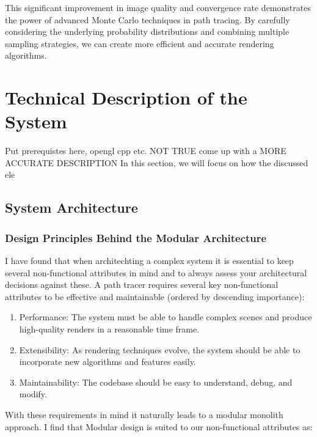 \documentclass[12pt]{article}
\begin{document}
This significant improvement in image quality and convergence rate demonstrates the power of advanced Monte Carlo techniques in path tracing. By carefully considering the underlying probability distributions and combining multiple sampling strategies, we can create more efficient and accurate rendering algorithms.

\section{Technical Description of the System}
\label{sec:system-description}

Put prerequistes here, opengl cpp etc.
NOT TRUE come up with a MORE ACCURATE DESCRIPTION
In this section, we will focus on how the discussed ele

\subsection{System Architecture}

\subsubsection{Design Principles Behind the Modular Architecture}

I have found that when architechting a complex system it is essential to keep several non-functional attributes in mind and to always assess your architectural decisions against these.
A path tracer requires several key non-functional attributes to be effective and maintainable (ordered by descending importance):

\begin{enumerate}
    \item Performance: The system must be able to handle complex scenes and produce high-quality renders in a reasonable time frame.
    \item Extensibility: As rendering techniques evolve, the system should be able to incorporate new algorithms and features easily.
    \item Maintainability: The codebase should be easy to understand, debug, and modify.
\end{enumerate}

With these requirements in mind it naturally leads to a modular monolith approach. I find that Modular design is suited to our non-functional attributes as:
\end{document}
